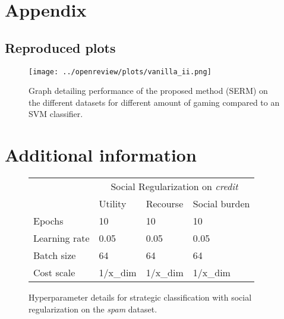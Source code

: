 \newpage
\section*{Appendix}
\subsection{Reproduced plots}\label{app:plots}
\begin{figure}[h]
    \centering
    \texttt{[image: ../openreview/plots/vanilla\_ii.png]}
    \caption{Graph detailing performance of the proposed method (SERM) on the different datasets for different amount of gaming compared to an SVM classifier.}
    \label{fig:vanilla_II}
\end{figure}
\section{Additional information}
\begin{figure}[h]
    \centering
    \begin{tabular}{l|lll|}
    \cline{2-4}
                                        & \multicolumn{3}{c|}{Social Regularization on \textit{credit}}                            \\ \cline{2-4} 
                                        & \multicolumn{1}{l|}{Utility}  & \multicolumn{1}{l|}{Recourse} & Social burden \\ \hline
    \multicolumn{1}{|l|}{Epochs}        & \multicolumn{1}{l|}{10}       & \multicolumn{1}{l|}{10}       & 10            \\ \hline
    \multicolumn{1}{|l|}{Learning rate} & \multicolumn{1}{l|}{0.05}     & \multicolumn{1}{l|}{0.05}     & 0.05          \\ \hline
    \multicolumn{1}{|l|}{Batch size}    & \multicolumn{1}{l|}{64}       & \multicolumn{1}{l|}{64}       & 64            \\ \hline
    \multicolumn{1}{|l|}{Cost scale}         & \multicolumn{1}{l|}{1/x\_dim} & \multicolumn{1}{l|}{1/x\_dim} & 1/x\_dim      \\ \hline
\end{tabular}
    \caption{Hyperparameter details for strategic classification with social regularization on the \textit{spam} dataset.}
    \label{tab:hyperparams_reg}
\end{figure}
